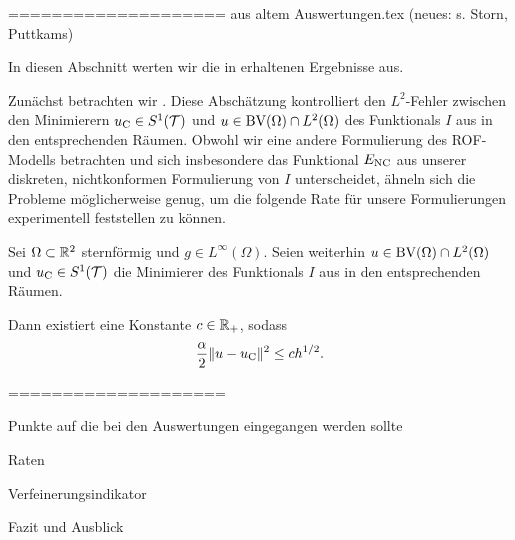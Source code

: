 ====================
aus altem Auswertungen.tex (neues: s. Storn, Puttkams)

In diesen Abschnitt werten wir die in  erhaltenen
Ergebnisse aus.


Zunächst betrachten wir \cite[S. 309, Theorem 10.7]{Bar15}. Diese
Abschätzung kontrolliert den
$L^2$-Fehler zwischen den Minimierern $u_{\textup{C}}\in S^1(\mathcal{T})$ und
$u\in\textup{BV}(\Omega)\cap L^2(\Omega)$ des Funktionals $I$ aus  in
den entsprechenden Räumen. Obwohl wir eine andere Formulierung des ROF-Modells 
betrachten und sich insbesondere das Funktional $E_\textup{NC}$ aus unserer diskreten,
nichtkonformen Formulierung von $I$ unterscheidet, ähneln sich die 
Probleme möglicherweise genug, um die folgende Rate für unsere Formulierungen
experimentell feststellen zu können.

\begin{theorem}
  \label{thm:errorEstimateCourant}
  Sei $\Omega\subset\mathbb{R}^2$ sternförmig und $g\in L^\infty(\Omega)$.  Seien
  weiterhin $u\in\textup{BV}(\Omega)\cap L^2(\Omega)$ und $u_{\textup{C}}\in S^1(\mathcal{T})$ die
  Minimierer des Funktionals $I$ aus  in den entsprechenden
  Räumen.

  Dann existiert eine Konstante $c\in\mathbb{R}_+$, sodass
  \begin{align*}
    \frac{\alpha}{2}\Vert u-u_{\textup{C}}\Vert^2\leq
    ch^{1/2}.
  \end{align*}
\end{theorem}

====================

Punkte auf die bei den Auswertungen eingegangen werden sollte

Raten

Verfeinerungsindikator

Fazit und Ausblick
